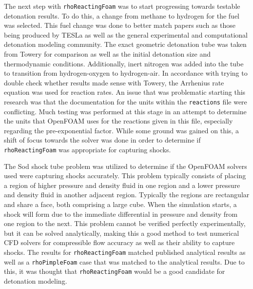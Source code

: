 The next step with \verb|rhoReactingFoam| was to start progressing towards testable detonation results. To do this, a change from methane to hydrogen for the fuel was selected. This fuel change was done to better match papers such as those being produced by TESLa as well as the general experimental and computational detonation modeling community. The exact geometric detonation tube was taken from Towery\cite{towery1} for comparison as well as the initial detonation size and thermodynamic conditions. Additionally, inert nitrogen was added into the tube to transition from hydrogen-oxygen to hydrogen-air. In accordance with trying to double check whether results made sense with Towery\cite{towery1}, the Arrhenius rate equation \cite{arrhenius} was used for reaction rates. An issue that was problematic starting this research was that the documentation for the units within the \verb|reactions| file were conflicting. Much testing was performed at this stage in an attempt to determine the units that OpenFOAM uses for the reactions given in this file, especially regarding the pre-exponential factor. While some ground was gained on this, a shift of focus towards the solver was done in order to determine if \verb|rhoReactingFoam| was appropriate for capturing shocks. 

The Sod shock tube problem was utilized to determine if the OpenFOAM solvers used were capturing shocks accurately. This problem typically consists of placing a region of higher pressure and density fluid in one region and a lower pressure and density fluid in another adjacent region. Typically the regions are rectangular and share a face, both comprising a large cube. When the simulation starts, a shock will form due to the immediate differential in pressure and density from one region to the next. This problem cannot be verified perfectly experimentally, but it can be solved analytically, making this a good method to test numerical CFD solvers for compressible flow accuracy as well as their ability to capture shocks. The results for \verb|rhoReactingFoam| matched published analytical results as well as a \verb|rhoPimpleFoam| case that was matched to the analytical results. Due to this, it was thought that \verb|rhoReactingFoam| would be a good candidate for detonation modeling. 

